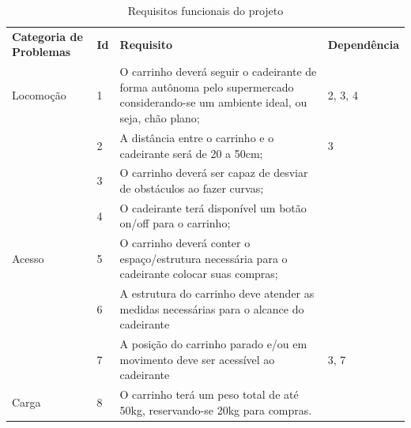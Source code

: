 \begin{table}[h]
 \centering
 \caption{Requisitos funcionais do projeto} \label{tab:req_func}
 {\renewcommand\arraystretch{1.25}
 \begin{tabular}{ l l l l }
  \cline{1-1}\cline{2-2}\cline{3-3}\cline{4-4}  
    \multicolumn{1}{p{3.167cm}|}{\textbf{Categoria de Problemas}} &
    \multicolumn{1}{p{1.283cm}|}{\textbf{Id}} &
    \multicolumn{1}{p{4.783cm}|}{\textbf{Requisito}} &
    \multicolumn{1}{p{2.383cm}}{\textbf{Dependência}}
  \\  
  \cline{1-1}\cline{2-2}\cline{3-3}\cline{4-4}  
    \multicolumn{1}{p{3.167cm}|}{Locomoção} &
    \multicolumn{1}{p{1.283cm}|}{1} &
    \multicolumn{1}{p{4.783cm}|}{O carrinho deverá seguir o cadeirante de forma autônoma pelo supermercado considerando-se um ambiente ideal, ou seja, chão plano;} &
    \multicolumn{1}{p{2.383cm}}{2, 3, 4}
  \\  
  \cline{1-1}\cline{2-2}\cline{3-3}\cline{4-4}  
    \multicolumn{1}{p{3.167cm}|}{ } &
    \multicolumn{1}{p{1.283cm}|}{2} &
    \multicolumn{1}{p{4.783cm}|}{A distância entre o carrinho e o cadeirante será de 20 a 50cm;} &
    \multicolumn{1}{p{2.383cm}}{3}
  \\  
  \cline{1-1}\cline{2-2}\cline{3-3}\cline{4-4}  
    \multicolumn{1}{p{3.167cm}|}{ } &
    \multicolumn{1}{p{1.283cm}|}{3} &
    \multicolumn{1}{p{4.783cm}|}{O carrinho deverá ser capaz de desviar de obstáculos ao fazer curvas;} &
    \multicolumn{1}{p{2.383cm}}{ }
  \\  
  \cline{1-1}\cline{2-2}\cline{3-3}\cline{4-4}  
    \multicolumn{1}{p{3.167cm}|}{ } &
    \multicolumn{1}{p{1.283cm}|}{4} &
    \multicolumn{1}{p{4.783cm}|}{O cadeirante terá disponível um botão on/off para o carrinho;} &
    \multicolumn{1}{p{2.383cm}}{ }
  \\  
  \cline{1-1}\cline{2-2}\cline{3-3}\cline{4-4}  
    \multicolumn{1}{p{3.167cm}|}{Acesso} &
    \multicolumn{1}{p{1.283cm}|}{5} &
    \multicolumn{1}{p{4.783cm}|}{O carrinho deverá conter o espaço/estrutura necessária para o cadeirante colocar suas compras;} &
    \multicolumn{1}{p{2.383cm}}{ }
  \\  
  \cline{1-1}\cline{2-2}\cline{3-3}\cline{4-4}  
    \multicolumn{1}{p{3.167cm}|}{ } &
    \multicolumn{1}{p{1.283cm}|}{6} &
    \multicolumn{1}{p{4.783cm}|}{A estrutura do carrinho deve atender as medidas necessárias para o alcance do cadeirante} &
    \multicolumn{1}{p{2.383cm}}{ }
  \\  
  \cline{1-1}\cline{2-2}\cline{3-3}\cline{4-4}  
    \multicolumn{1}{p{3.167cm}|}{ } &
    \multicolumn{1}{p{1.283cm}|}{7} &
    \multicolumn{1}{p{4.783cm}|}{A posição do carrinho parado e/ou em movimento deve ser acessível ao cadeirante} &
    \multicolumn{1}{p{2.383cm}}{3, 7}
  \\  
  \cline{1-1}\cline{2-2}\cline{3-3}\cline{4-4}  
    \multicolumn{1}{p{3.167cm}|}{Carga} &
    \multicolumn{1}{p{1.283cm}|}{8} &
    \multicolumn{1}{p{4.783cm}|}{O carrinho terá um peso total de até 50kg, reservando-se 20kg para compras.} &
    \multicolumn{1}{p{2.383cm}}{ }
  \\  
  \hline


\end{tabular}}
\end{table}
